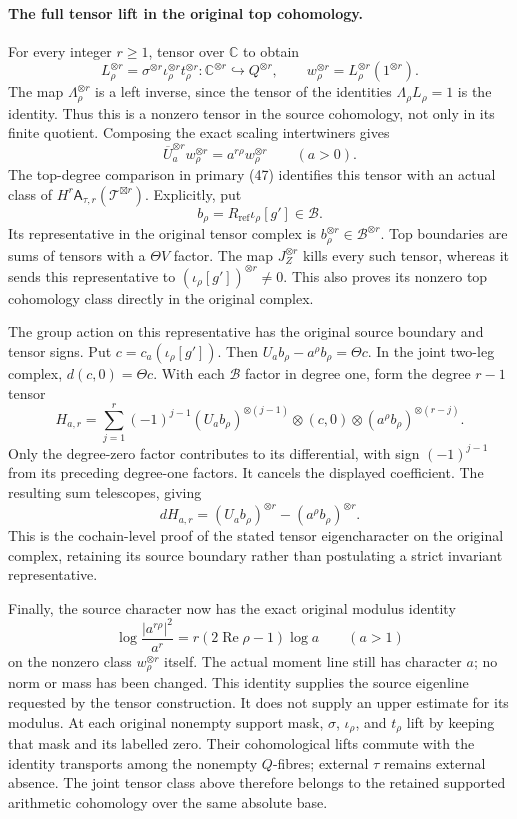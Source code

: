 \paragraph{The full tensor lift in the original top cohomology.}
For every integer \(r\geq1\), tensor over \(\mathbb C\) to obtain
\[
 L_\rho^{\otimes r}
 =\sigma^{\otimes r}\iota_\rho^{\otimes r}t_\rho^{\otimes r}:
 \mathbb C^{\otimes r}\hookrightarrow Q^{\otimes r},
 \qquad w_\rho^{\otimes r}=L_\rho^{\otimes r}(1^{\otimes r}).
\]
The map \(\Lambda_\rho^{\otimes r}\) is a left inverse, since the
tensor of the identities \(\Lambda_\rho L_\rho=1\) is the identity.
Thus this is a nonzero tensor in the source cohomology, not only in its
finite quotient. Composing the exact scaling intertwiners gives
\[
 \overline U_a^{\otimes r}w_\rho^{\otimes r}
 =a^{r\rho}w_\rho^{\otimes r}\qquad(a>0).
\]
The top-degree comparison in primary (47) identifies this tensor with
an actual class of
\(H^r\mathsf A_{\tau,r}(\mathcal T^{\boxtimes r})\).
Explicitly, put
\[
 b_\rho=R_{\mathrm{ref}}\iota_\rho[g']\in\mathscr B.
\]
Its representative in the original tensor complex is
\(b_\rho^{\otimes r}\in\mathscr B^{\otimes r}\). Top boundaries are
sums of tensors with a \(\Theta V\) factor. The map
\(J_Z^{\otimes r}\) kills every such tensor, whereas it sends this
representative to \((\iota_\rho[g'])^{\otimes r}\ne0\). This also
proves its nonzero top cohomology class directly in the original
complex.

The group action on this representative has the original source
boundary and tensor signs. Put
\(c=c_a(\iota_\rho[g'])\). Then
\(U_ab_\rho-a^\rho b_\rho=\Theta c\). In the joint two-leg complex,
\(d(c,0)=\Theta c\). With each \(\mathscr B\) factor in degree one,
form the degree \(r-1\) tensor
\[
 H_{a,r}=\sum_{j=1}^{r}(-1)^{j-1}
 (U_ab_\rho)^{\otimes(j-1)}\otimes(c,0)
 \otimes(a^\rho b_\rho)^{\otimes(r-j)}.
\]
Only the degree-zero factor contributes to its differential, with
sign \((-1)^{j-1}\) from its preceding degree-one factors. It cancels
the displayed coefficient. The resulting sum telescopes, giving
\[
 dH_{a,r}=(U_ab_\rho)^{\otimes r}
             -(a^\rho b_\rho)^{\otimes r}.
\]
This is the cochain-level proof of the stated tensor eigencharacter
on the original complex, retaining its source boundary rather than
postulating a strict invariant representative.

Finally, the source character now has the exact original modulus
identity
\[
 \log\frac{|a^{r\rho}|^2}{a^r}
 =r(2\operatorname{Re}\rho-1)\log a\qquad(a>1)
\]
on the nonzero class \(w_\rho^{\otimes r}\) itself. The actual moment
line still has character \(a\); no norm or mass has been changed.
This identity supplies the source eigenline requested by the tensor
construction. It does not supply an upper estimate for its modulus.
At each original nonempty support mask, \(\sigma\), \(\iota_\rho\),
and \(t_\rho\) lift by keeping that mask and its labelled zero.
Their cohomological lifts commute with the identity transports among
the nonempty \(Q\)-fibres; external \(\tau\) remains external absence.
The joint tensor class above therefore belongs to the retained
supported arithmetic cohomology over the same absolute base.

